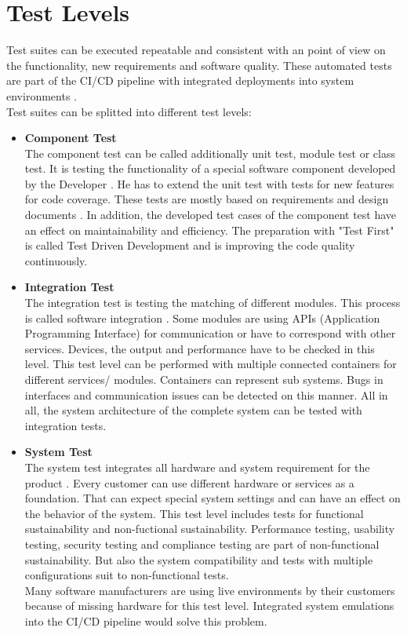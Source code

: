 \section{Test Levels}\label{TestLevel}

Test suites can be executed repeatable and consistent with an point of view on the functionality, new requirements and software quality. These automated tests are part of the CI/CD pipeline with integrated deployments into system environments \cite[~p.112]{Scholl2019}. \\
Test suites can be splitted into different test levels:
\begin{itemize}
\item \textbf{Component Test}  \\
The component test can be called additionally unit test, module test or class test. 
It is testing the functionality of a special software component developed by the Developer \cite[~p.66]{Spillner2019}.
He has to extend the unit test with tests for new features for code coverage. These tests are mostly based on requirements and design documents \cite[~p.63]{Spillner2019}. In addition, the developed test cases of the component test have an effect on maintainability and efficiency.
The preparation with "Test First" is called Test Driven Development and is improving the code quality continuously.

\item \textbf{Integration Test} \\
The integration test is testing the matching of different modules. This process is called software integration \cite[~p.71]{Spillner2019}. Some modules are using APIs (Application Programming Interface) for communication or have to correspond with other services.
Devices, the output and performance have to be checked in this level.
This test level can be performed with multiple connected containers for different services/ modules. Containers can represent sub systems. Bugs in interfaces and communication issues can be detected on this manner.
All in all, the system architecture of the complete system can be tested with integration tests.

\item \textbf{System Test} \\
The system test integrates all hardware and system requirement for the product \cite[~p.79]{Spillner2019}.
Every customer can use different hardware or services as a foundation. That can expect special system settings and can have an effect on the behavior of the system.
This test level includes tests for functional sustainability \cite[~p.87]{Spillner2019} and non-fuctional sustainability.
Performance testing, usability testing, security testing and compliance testing are part of non-functional sustainability. But also the system compatibility and tests with multiple configurations suit to non-functional tests. \\
Many software manufacturers are using live environments by their customers because of missing hardware for this test level. Integrated system emulations into the CI/CD pipeline would solve this problem.


\end{itemize}
